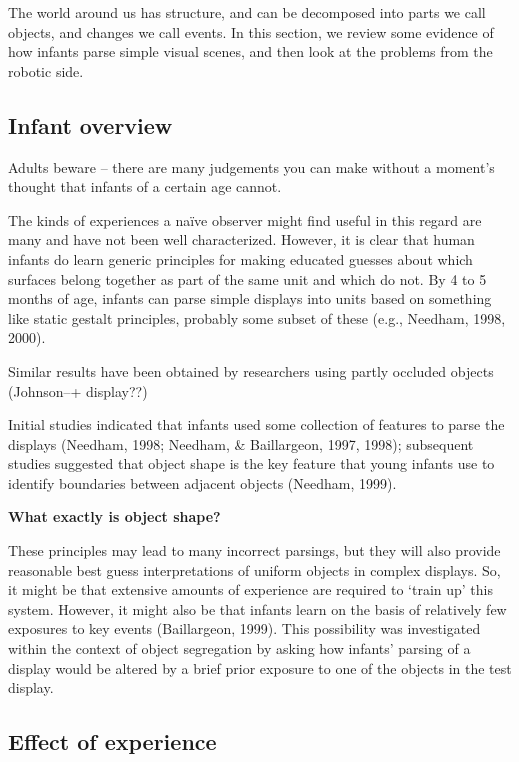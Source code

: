 
The world around us has structure, and can be decomposed into parts we
call objects, and changes we call events.  In this section, 
we review some evidence of how infants parse simple visual scenes,
and then look at the problems from the robotic side.



\subsection{Infant overview}

Adults beware -- there are many judgements you can make without a
moment's thought that infants of a certain age cannot.

The kinds of experiences a na\"{i}ve observer might find
useful in this regard are many and have not been well characterized.
However, it is clear that human infants do learn generic principles
for making educated guesses about which surfaces belong together as
part of the same unit and which do not.  By 4 to 5 months of age,
infants can parse simple displays into units based on something like
static gestalt principles, probably some subset of these (e.g.,
Needham, 1998, 2000).

Similar results have been obtained by researchers using partly
occluded objects (Johnson--+ display??)


Initial studies indicated that infants used some collection of
features to parse the displays (Needham, 1998; Needham, \& Baillargeon,
1997, 1998); subsequent studies suggested that object shape is the key
feature that young infants use to identify boundaries between adjacent
objects (Needham, 1999).

{
\bf What exactly is object shape?
}


These principles may lead to many incorrect parsings, but they will
also provide reasonable best guess interpretations of uniform objects
in complex displays.  So, it might be that extensive amounts of
experience are required to `train up' this system.
However, it might also be that infants learn on the basis of
relatively few exposures to key events (Baillargeon, 1999).  This
possibility was investigated within the context of object segregation
by asking how infants' parsing of a display would be altered
by a brief prior exposure to one of the objects in the test display.


\subsection{Effect of experience}


